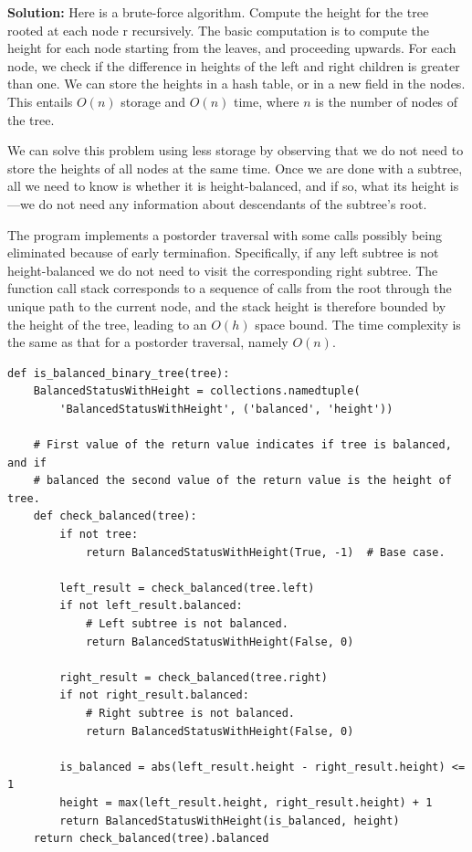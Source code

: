 \documentclass[11pt,a4paper]{article}
\begin{document}
\textbf{Solution:} Here is a brute-force algorithm. Compute the height for the
tree rooted at each node r recursively. The basic computation is to compute the
height for each node starting from the leaves, and proceeding upwards. For each
node, we check if the difference in heights of the left and right children is
greater than one. We can store the heights in a hash table, or in a new field in
the nodes. This entails $O(n)$ storage and $O(n)$ time, where $n$ is the number
of nodes of the tree.

We can solve this problem using less storage by observing that we do not need to
store the heights of all nodes at the same time. Once we are done with a
subtree, all we need to know is whether it is height-balanced, and if so, what
its height is---we do not need any information about descendants of the
subtree's root.

The program implements a postorder traversal with some calls possibly being
eliminated because of early terminafion. Specifically, if any left subtree is
not height-balanced we do not need to visit the corresponding right subtree. The
function call stack corresponds to a sequence of calls from the root through the
unique path to the current node, and the stack height is therefore bounded by
the height of the tree, leading to an $O(h)$ space bound. The time complexity is
the same as that for a postorder traversal, namely $O(n)$.

\begin{verbatim}
def is_balanced_binary_tree(tree): 
    BalancedStatusWithHeight = collections.namedtuple(
        'BalancedStatusWithHeight', ('balanced', 'height'))

    # First value of the return value indicates if tree is balanced, and if 
    # balanced the second value of the return value is the height of tree. 
    def check_balanced(tree):
        if not tree:
            return BalancedStatusWithHeight(True, -1)  # Base case.

        left_result = check_balanced(tree.left)
        if not left_result.balanced:
            # Left subtree is not balanced.
            return BalancedStatusWithHeight(False, 0)

        right_result = check_balanced(tree.right) 
        if not right_result.balanced:
            # Right subtree is not balanced.
            return BalancedStatusWithHeight(False, 0)

        is_balanced = abs(left_result.height - right_result.height) <= 1
        height = max(left_result.height, right_result.height) + 1
        return BalancedStatusWithHeight(is_balanced, height)
    return check_balanced(tree).balanced
\end{verbatim}  
\end{document}
